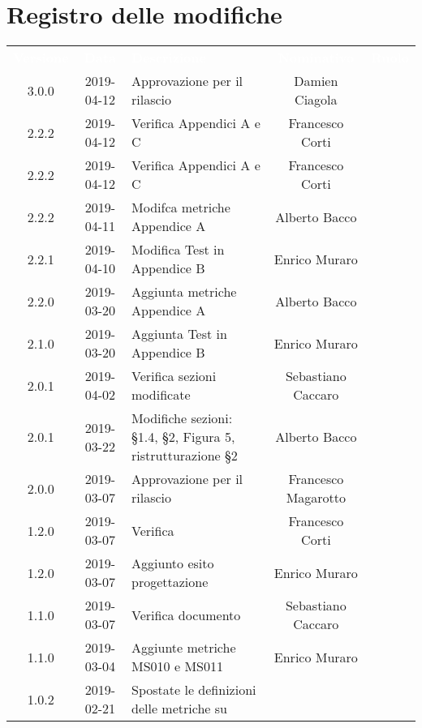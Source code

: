 \section*{Registro delle modifiche}
{
	\renewcommand{\arraystretch}{1.5}
	\centering
	\begin{longtable}{c c C{4cm} c  c }
		\textcolor{white}{\textbf{Versione}} &
		\textcolor{white}{\textbf{Data}} &
		\textcolor{white}{\textbf{Descrizione}} &
		\textcolor{white}{\textbf{Nominativo}} &
		\textcolor{white}{\textbf{Ruolo}}
		
		\\
		3.0.0 &
		2019-04-12 &
		Approvazione per il rilascio &
		Damien Ciagola &
		\Res{}
		\\
		2.2.2 &
		2019-04-12 &
		Verifica Appendici A e C &
		Francesco Corti &
		\ver{}	
		\\
		2.2.2 &
		2019-04-12 &
		Verifica Appendici A e C &
		Francesco Corti &
		\ver{}	
		\\
		2.2.2 &
		2019-04-11 &
		Modifca metriche Appendice A &
		Alberto Bacco &
		\reda{}	
		\\
		2.2.1 &
		2019-04-10 &
		Modifica Test in Appendice B &
		Enrico Muraro &
		\reda{}	
		\\
		2.2.0 &
		2019-03-20 &
		Aggiunta metriche Appendice A &
		Alberto Bacco &
		\reda{}	
		\\
		2.1.0 &
		2019-03-20 &
		Aggiunta Test in Appendice B &
		Enrico Muraro &
		\reda{}	
		\\
		2.0.1 &
		2019-04-02 &
		Verifica sezioni modificate &
		Sebastiano Caccaro &
		\ver{}	
		\\
		2.0.1 &
		2019-03-22 &
		Modifiche sezioni: §1.4, §2, Figura 5, ristrutturazione §2 &
		Alberto Bacco &
		\reda{}	
		\\
		2.0.0 &
		2019-03-07 &
		Approvazione per il rilascio &
		Francesco Magarotto &
		\Res{}
		\\		
		1.2.0 &
		2019-03-07 &
		Verifica &
		Francesco Corti &
		\ver{} \\
		1.2.0 &
		2019-03-07 &
		Aggiunto esito progettazione &
		Enrico Muraro &
		\reda{}
		\\
		1.1.0 &
		2019-03-07 &
		Verifica documento &
		Sebastiano Caccaro &
		\ver{}
		\\
		1.1.0 &
		2019-03-04 &
		Aggiunte metriche MS010 e MS011 &
		Enrico Muraro &
		\reda{}
		\\
		1.0.2 &
		2019-02-21 &
		Spostate le definizioni delle metriche su \NdP &

\end{longtable}}
